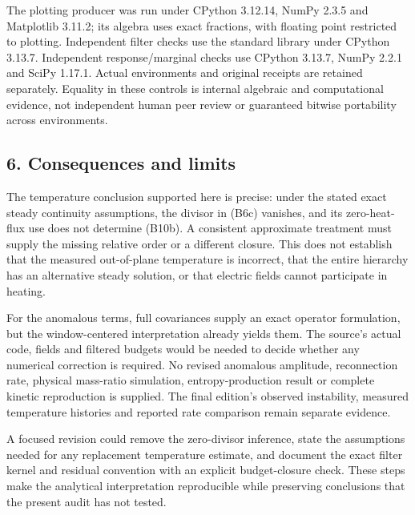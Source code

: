 The plotting producer was run under CPython 3.12.14, NumPy 2.3.5 and
Matplotlib 3.11.2; its algebra uses exact fractions, with floating point
restricted to plotting. Independent filter checks use the standard
library under CPython 3.13.7. Independent response/marginal checks use
CPython 3.13.7, NumPy 2.2.1 and SciPy 1.17.1. Actual environments and
original receipts are retained separately. Equality in these controls is
internal algebraic and computational evidence, not independent human
peer review or guaranteed bitwise portability across environments.

\subsection{6. Consequences and limits}\label{consequences-and-limits}

The temperature conclusion supported here is precise: under the stated
exact steady continuity assumptions, the divisor in (B6c) vanishes, and
its zero-heat-flux use does not determine (B10b). A consistent
approximate treatment must supply the missing relative order or a
different closure. This does not establish that the measured
out-of-plane temperature is incorrect, that the entire hierarchy has an
alternative steady solution, or that electric fields cannot participate
in heating.

For the anomalous terms, full covariances supply an exact operator
formulation, but the window-centered interpretation already yields them.
The source's actual code, fields and filtered budgets would be needed to
decide whether any numerical correction is required. No revised
anomalous amplitude, reconnection rate, physical mass-ratio simulation,
entropy-production result or complete kinetic reproduction is supplied.
The final edition's observed instability, measured temperature histories
and reported rate comparison remain separate evidence.

A focused revision could remove the zero-divisor inference, state the
assumptions needed for any replacement temperature estimate, and
document the exact filter kernel and residual convention with an
explicit budget-closure check. These steps make the analytical
interpretation reproducible while preserving conclusions that the
present audit has not tested.

